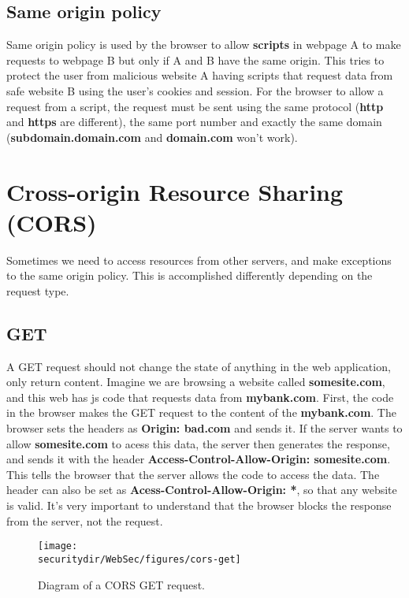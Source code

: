 \subsection{Same origin policy}
Same origin policy is used by the browser to allow \textbf{scripts} in webpage A to make requests to webpage B but only if A and B have the same origin.
This tries to protect the user from malicious website A having scripts that request data from safe website B using the user's cookies and session. For the browser to allow a request from a script, the request must be sent using the same protocol (\textbf{http} and \textbf{https} are different), the same port number and exactly the same domain (\textbf{subdomain.domain.com }and \textbf{domain.com} won't work).

\section{Cross-origin Resource Sharing (CORS)}
Sometimes we need to access resources from other servers, and make exceptions to the same origin policy. This is accomplished differently depending on the request type.

\subsection{GET}
A GET request should not change the state of anything in the web application, only return content. 
Imagine we are browsing a website called \textbf{somesite.com}, and this web has js code that requests data from \textbf{mybank.com}. First, the code in the browser makes the GET request to the content of the \textbf{mybank.com}. The browser sets the headers as \textbf{Origin: bad.com} and sends it. If the server wants to allow \textbf{somesite.com} to acess this data, the server then generates the response, and sends it with the header \textbf{Access-Control-Allow-Origin: somesite.com}. This tells the browser that the server allows the code to access the data. The header can also be set as \textbf{Acess-Control-Allow-Origin: *}, so that any website is valid. It's very important to understand that the browser blocks the response from the server, not the request.

\begin{figure}[htb]
	\begin{centering}
		\texttt{[image: \\securitydir/WebSec/figures/cors-get]}
		\par\end{centering}
	\caption{\label{fig:ecb} Diagram of a CORS GET request.}
\end{figure}


